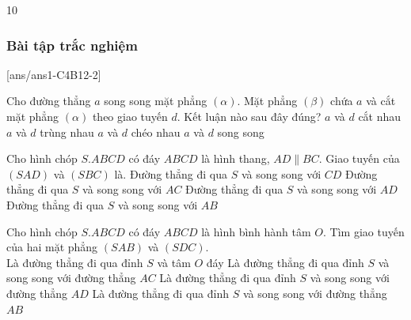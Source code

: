 \begin{indapan}{10}
\subsubsection{Bài tập trắc nghiệm}
[ans/ans1-C4B12-2]
\begin{ex}%
    Cho đường thẳng $a$ song song mặt phẳng $\left(\alpha\right)$. Mặt phẳng $\left(\beta\right)$ chứa $a$ và cắt mặt phẳng $\left(\alpha\right)$ theo giao tuyến $d$. Kết luận nào sau đây đúng?
    \choice
    {$a$ và $d$ cắt nhau}
    {$a$ và $d$ trùng nhau}
    {$a$ và $d$ chéo nhau}
    {\True $a$ và $d$ song song}
    \loigiai{}
\end{ex}

\begin{ex}%
    Cho hình chóp $S.ABCD$ có đáy $ABCD$ là hình thang, $AD\parallel BC$. Giao tuyến của $\left(SAD\right)$ và $\left(SBC\right)$ là.
    \choice
    {Đường thẳng đi qua $S$ và song song với $CD$}
    {Đường thẳng đi qua $S$ và song song với $AC$}
    {\True Đường thẳng đi qua $S$ và song song với $AD$}
    {Đường thẳng đi qua $S$ và song song với $AB$}
\end{ex}

\begin{ex}%
        Cho hình chóp $S.ABCD$ có đáy $ABCD$ là hình bình hành tâm $O$. Tìm giao tuyến của hai mặt phẳng $\left(SAB\right)$ và $\left(SDC\right)$.\\
        \choice
        {Là đường thẳng đi qua đỉnh $S$ và tâm $O$ đáy}
        {Là đường thẳng đi qua đỉnh $S$ và song song với đường thẳng $AC$}
        {Là đường thẳng đi qua đỉnh $S$ và song song với đường thẳng $AD$}
        {\True Là đường thẳng đi qua đỉnh $S$ và song song với đường thẳng $AB$}


\end{ex}
\end{indapan}
